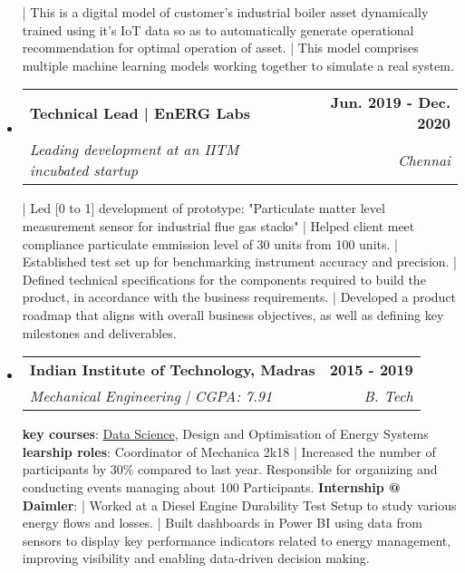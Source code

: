 \documentclass[a4paper, 10.9999pt]{article}
\makeatletter
\newlength{\outerbordwidth}
\newcommand{\resheading}[1]{\vspace{8pt}
  \parbox{\textwidth}{\setlength{\FrameSep}{\outerbordwidth}
    \begin{shaded}
\setlength{\fboxsep}{0pt}\framebox[\textwidth][l]{\setlength{\fboxsep}{4pt}\fcolorbox{shadecolorB}{shadecolorB}{\textbf{\sffamily{\mbox{~}\makebox[6.762in][l]{\large #1} \vphantom{p\^{E}}}}}}
    \end{shaded}
  }\vspace{-5pt}
}
\newcommand{\ressubheading}[4]{
\begin{tabular*}{19cm}{l@{\cftdotfill{\cftsecdotsep}\extracolsep{\fill}}r}
		\textbf{#1} & \textbf{#2} \\
		\textit{#3} & \textit{#4} \\
\end{tabular*}\vspace{-6pt}}
\newcommand\tab[1][1cm]{\hspace*{#1}}
\makeatother
\begin{document}
\begin{itemize}
	\newline \tab | This is a digital model of customer's industrial boiler asset dynamically trained using it's IoT data so as to automatically generate operational recommendation for optimal operation of asset.
	\newline \tab | This model comprises multiple machine learning models working together to simulate a real system.
\item
	\ressubheading{Technical Lead | EnERG Labs}{Jun. 2019 - Dec. 2020}{Leading development at an IITM incubated startup}{Chennai}
	\newline
	\newline | Led [0 to 1] development of prototype: "Particulate matter level measurement sensor for industrial flue gas stacks"
	\newline | Helped client meet compliance particulate emmission level of 30 units from 100 units.
	\newline | Established test set up for benchmarking instrument accuracy and precision. %
	\newline | Defined technical specifications for the components required to build the product, in accordance with the business requirements.
	\newline | Developed a product roadmap that aligns with overall business objectives, as well as defining key milestones and deliverables.	
\end{itemize}


\resheading{Education}
\begin{itemize}
\item
	\ressubheading{Indian Institute of Technology, Madras}{2015 - 2019}{Mechanical Engineering | CGPA: 7.91}{B. Tech}
	\newline 
	\newline \textbf{key courses}: \href{https://www.udemy.com/certificate/UC-4aa83664-cd41-4b8e-be7c-201c642d643d/}{Data Science}, Design and Optimisation of Energy Systems
	\newline \textbf{learship roles}: Coordinator of Mechanica 2k18
	\newline \tab | Increased the number of participants by 30\% compared to last year. Responsible for organizing and conducting events managing about 100 Participants.
	\newline \textbf{Internship @ Daimler}: 
	\newline \tab | Worked at a Diesel Engine Durability Test Setup to study various energy flows and losses.
	\newline \tab | Built dashboards in Power BI using data from sensors to display key performance indicators related to energy management, improving visibility and enabling data-driven decision making.
\end{itemize}
\end{document}
